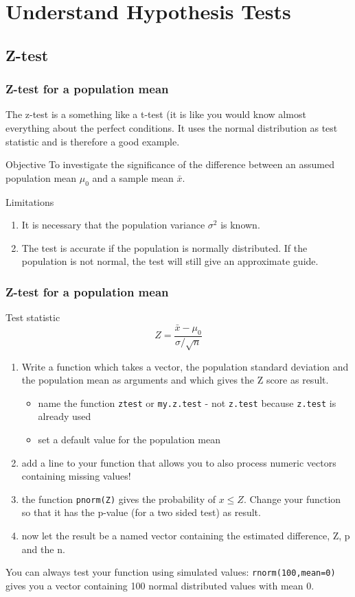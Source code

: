 \documentclass[xcolor={table}]{beamer}
\begin{document}
\section{Understand Hypothesis Tests}\small 
\subsection{Z-test}
\begin{frame}\frametitle{Z-test for a population mean} 
The z-test is a something like a t-test (it is like you would know almost everything about the perfect conditions. It uses the normal distribution as test statistic and is therefore a good example.
  \begin{block}{Objective}
    To investigate the significance of the difference between an assumed population mean $\mu_0$ and a sample mean $\bar{x}$.
  \end{block}
  \begin{alertblock}{Limitations}
    \begin{enumerate}
      \item It is necessary that the population variance $\sigma^2$ is known. 
      \item The test is accurate if the population is normally distributed. If the population is not normal, the test will still give an approximate guide.
    \end{enumerate}
  \end{alertblock}
\end{frame}


\begin{frame}[fragile]\frametitle{Z-test for a population mean}\footnotesize
    \begin{exampleblock}{Test statistic}
    $$Z = \frac{\bar{x}-\mu_0}{\sigma/\sqrt{n}}$$
  \end{exampleblock}
    \begin{enumerate}
    \item Write a function which takes a vector, the population standard deviation and the population mean as arguments and which gives the Z score as result. 
      \begin{itemize}
      \item name the function \texttt{ztest} or \texttt{my.z.test} - not \texttt{z.test} because \texttt{z.test} is already used
      \item set a default value for the population mean
      \end{itemize}
    \item add a line to your function that allows you to also process numeric vectors containing missing values!
    \item the function \texttt{pnorm(Z)} gives the probability of $x \leq Z $. Change your function so that it has the p-value (for a two sided test) as result. 
    \item now let the result be a named vector containing the estimated difference, Z, p and the n.
    \end{enumerate}
You can always test your function using simulated values: \texttt{rnorm(100,mean=0)} gives you a vector containing 100 normal distributed values with mean 0.
\end{frame}
\end{document}
